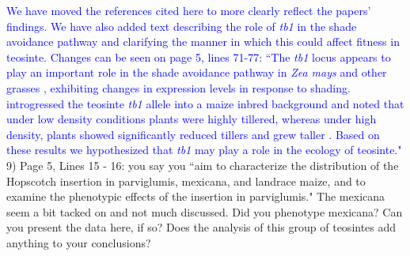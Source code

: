 \documentclass[11pt]{article}
\newcommand{\res}[1]{\noindent \textcolor{blue}{{#1}} \\}
\begin{document}
\res{We have moved the references cited here to more clearly reflect the papers' findings.  We have also added text describing the role of \emph{tb1} in the shade avoidance pathway and clarifying the manner in which this could affect fitness in teosinte. Changes can be seen on page 5, lines 71-77: ``The \emph{tb1} locus appears to play an important role in the shade avoidance pathway in \emph{Zea mays} \citep{LukensDoebley1999} and other grasses \citep{KebromBrutnell2007}, exhibiting changes in expression levels in response to shading. \citet{LukensDoebley1999} introgressed the teosinte \emph{tb1} allele into a maize inbred background and noted that under low density conditions plants were highly tillered, whereas under high density, plants showed significantly reduced tillers and grew taller \citep{LukensDoebley1999}. Based on these results we hypothesized that \emph{tb1} may play a role in the ecology of teosinte."}

9) Page 5, Lines 15 - 16: you say you ``aim to characterize the distribution of the Hopscotch insertion in parviglumis, mexicana, and landrace maize, and to examine the phenotypic effects of the insertion in parviglumis."  The mexicana seem a bit tacked on and not much discussed. Did you phenotype mexicana? Can you present the data here, if so? Does the analysis of this group of teosintes add anything to your conclusions?\\
\end{document}
